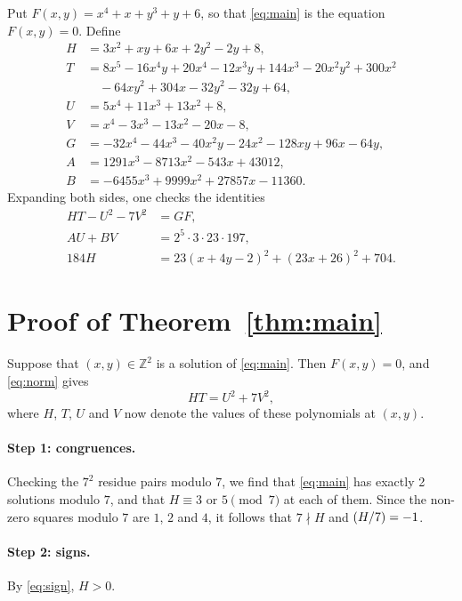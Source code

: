 \documentclass[11pt]{article}
\newcommand{\Z}{\mathbb{Z}}
\newcommand{\leg}[2]{\mathchoice{\biggl(\dfrac{#1}{#2}\biggr)}{(#1/#2)}{(#1/#2)}{(#1/#2)}}
\begin{document}
Put $F(x,y)=x^{4}+x+y^{3}+y+6$, so that \eqref{eq:main} is the equation $F(x,y)=0$. Define
\begin{align*}
H&=3x^{2}+xy+6x+2y^{2}-2y+8,\\
T&=8x^{5}-16x^{4}y+20x^{4}-12x^{3}y+144x^{3}-20x^{2}y^{2}+300x^{2}\\
&\quad-64xy^{2}+304x-32y^{2}-32y+64,\\
U&=5x^{4}+11x^{3}+13x^{2}+8,\\
V&=x^{4}-3x^{3}-13x^{2}-20x-8,\\
G&=-32x^{4}-44x^{3}-40x^{2}y-24x^{2}-128xy+96x-64y,\\
A&=1291x^{3}-8713x^{2}-543x+43012,\\
B&=-6455x^{3}+9999x^{2}+27857x-11360.
\end{align*}
Expanding both sides, one checks the identities
\begin{align}
HT-U^2-7V^2&=GF,\label{eq:norm}\\
AU+BV&=2^{5}\cdot 3\cdot 23\cdot 197,\label{eq:bezout}\\
184H&=23(x+4y-2)^2+(23x+26)^2+704.\label{eq:sign}
\end{align}

\section{Proof of Theorem~\ref{thm:main}}

Suppose that $(x,y)\in\Z^2$ is a solution of \eqref{eq:main}. Then $F(x,y)=0$, and \eqref{eq:norm} gives
\begin{equation}\label{eq:HT}
HT=U^2+7V^2,
\end{equation}
where $H$, $T$, $U$ and $V$ now denote the values of these polynomials at $(x,y)$.

\paragraph{Step 1: congruences.} Checking the $7^2$ residue pairs modulo $7$, we find that \eqref{eq:main} has exactly 2 solutions modulo $7$, and that $H\equiv3\text{ or }5\pmod{7}$ at each of them. Since the non-zero squares modulo $7$ are $1$, $2$ and $4$, it follows that $7\nmid H$ and $\leg{H}{7}=-1$.

\paragraph{Step 2: signs.} By \eqref{eq:sign}, $H>0$.
\end{document}
